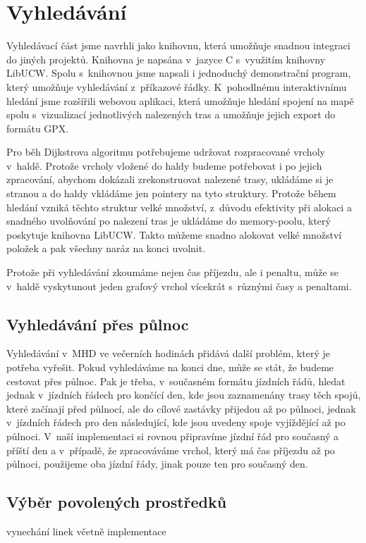 \section{Vyhledávání}
\label{ch:implementace:vyhledavani}
Vyhledávací část jsme navrhli jako knihovnu, která umožňuje snadnou integraci do
jiných projektů. Knihovna je napsána v~jazyce C s~využitím knihovny LibUCW.
Spolu s~knihovnou jsme napsali i jednoduchý demonstrační program, který umožňuje
vyhledávání z~příkazové řádky. K~pohodlnému interaktivnímu hledání jsme
rozšířili webovou aplikaci, která umožňuje hledání spojení na mapě spolu
s~vizualizací jednotlivých nalezených tras a umožňuje jejich export do formátu
GPX.

Pro běh Dijkstrova algoritmu potřebujeme udržovat rozpracované vrcholy v~haldě.
Protože vrcholy vložené do haldy budeme potřebovat i po jejich zpracování,
abychom dokázali zrekonstruovat nalezené trasy, ukládáme si je stranou a do
haldy vkládáme jen pointery na tyto struktury. Protože během hledání vzniká
těchto struktur velké množství, z~důvodu efektivity při alokaci a snadného
uvolňování po nalezení tras je ukládáme do memory-poolu, který poskytuje
knihovna LibUCW. Takto můžeme snadno alokovat velké množství položek a pak
všechny naráz na konci uvolnit.

Protože při vyhledávání zkoumáme nejen čas příjezdu, ale i penaltu, může se
v~haldě vyskytunout jeden grafový vrchol vícekrát s~různými časy a penaltami.

\subsection{Vyhledávání přes půlnoc}
Vyhledávání v~MHD ve večerních hodinách přidává další problém, který je potřeba
vyřešit. Pokud vyhledáváme na konci dne, může se stát, že budeme cestovat přes
půlnoc. Pak je třeba, v~současném formátu jízdních řádů, hledat jednak
v~jízdních řádech pro končící den, kde jsou zaznamenány trasy těch spojů, které
začínají před půlnocí, ale do cílové zastávky přijedou až po půlnoci, jednak
v~jízdních řádech pro den následující, kde jsou uvedeny spoje vyjíždějící až po
půlnoci. V~naší implementaci si rovnou připravíme jízdní řád pro současný a
příští den a v~případě, že zpracováváme vrchol, který má čas příjezdu až po
půlnoci, použijeme oba jízdní řády, jinak pouze ten pro současný den.
\subsection{Výběr povolených prostředků}
\TODO vynechání linek včetně implementace
